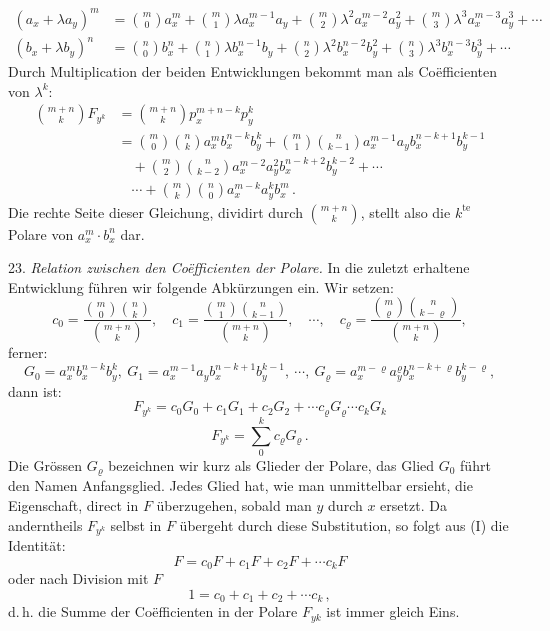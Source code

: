 \documentclass[11pt]{article}
\providecommand{\weberpage}[1]{}
\providecommand{\weq}[2]{\begin{equation}\tag{#1}#2\end{equation}}
\begin{document}
\weberpage{25}
\[
\begin{aligned}
(a_x+\lambda a_y)^m &= \binom{m}{0}a_x^m+\binom{m}{1}\lambda a_x^{m-1}a_y+\binom{m}{2}\lambda^2 a_x^{m-2}a_y^2+\binom{m}{3}\lambda^3 a_x^{m-3}a_y^3+\cdots\\
(b_x+\lambda b_y)^n &= \binom{n}{0}b_x^n+\binom{n}{1}\lambda b_x^{n-1}b_y+\binom{n}{2}\lambda^2 b_x^{n-2}b_y^2+\binom{n}{3}\lambda^3 b_x^{n-3}b_y^3+\cdots
\end{aligned}
\]
Durch Multiplication der beiden Entwicklungen bekommt man als Co\"efficienten von $\lambda^k$:
\[
\begin{aligned}
\binom{m+n}{k}F_{y^k} &= \binom{m+n}{k}p_x^{m+n-k}p_y^k\\
&= \binom{m}{0}\binom{n}{k}a_x^m b_x^{n-k}b_y^k+\binom{m}{1}\binom{n}{k-1}a_x^{m-1}a_y b_x^{n-k+1}b_y^{k-1}\\
&\quad+\binom{m}{2}\binom{n}{k-2}a_x^{m-2}a_y^2 b_x^{n-k+2}b_y^{k-2}+\cdots\\
&\quad\cdots+\binom{m}{k}\binom{n}{0}a_x^{m-k}a_y^k b_x^m\,.
\end{aligned}
\]
Die rechte Seite dieser Gleichung, dividirt durch $\binom{m+n}{k}$, stellt also die $k^{\text{te}}$ Polare von $a_x^m\cdot b_x^n$ dar.

23. \textit{Relation zwischen den Co\"efficienten der Polare.} In die zuletzt erhaltene Entwicklung führen wir folgende Abkürzungen ein. Wir setzen:
\[
c_0=\frac{\binom{m}{0}\binom{n}{k}}{\binom{m+n}{k}},\quad c_1=\frac{\binom{m}{1}\binom{n}{k-1}}{\binom{m+n}{k}},\quad\cdots,\quad c_\varrho=\frac{\binom{m}{\varrho}\binom{n}{k-\varrho}}{\binom{m+n}{k}},
\]
ferner:
\[
G_0=a_x^m b_x^{n-k}b_y^k,\ G_1=a_x^{m-1}a_y b_x^{n-k+1}b_y^{k-1},\ \cdots,\ G_\varrho=a_x^{m-\varrho}a_y^\varrho b_x^{n-k+\varrho}b_y^{k-\varrho},
\]
dann ist:
\[
F_{y^k}=c_0G_0+c_1G_1+c_2G_2+\cdots c_\varrho G_\varrho\cdots c_kG_k
\]
\weq{I}{F_{y^k}=\sum_0^k c_\varrho G_\varrho\,.}
Die Grössen $G_\varrho$ bezeichnen wir kurz als \glqq Glieder\grqq{} der Polare, das Glied $G_0$ führt den Namen \glqq Anfangsglied\grqq{}. Jedes Glied hat, wie man unmittelbar ersieht, die Eigenschaft, direct in $F$ überzugehen, sobald man $y$ durch $x$ ersetzt. Da anderntheils $F_{y^k}$ selbst in $F$ übergeht durch diese Substitution, so folgt aus (I) die Identität:
\[
F=c_0F+c_1F+c_2F+\cdots c_kF
\]
oder nach Division mit $F$
\weq{II}{1=c_0+c_1+c_2+\cdots c_k\,,}
d.\,h. \glqq die Summe der Co\"efficienten in der Polare $F_{yk}$ ist immer gleich Eins.\grqq{}
\end{document}
